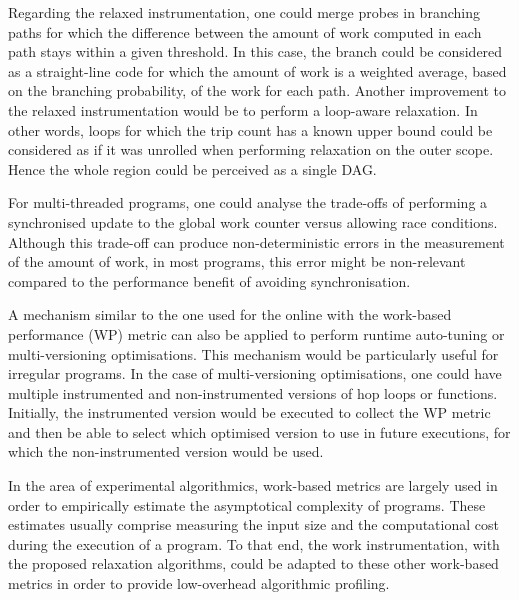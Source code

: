 Regarding the relaxed instrumentation,
one could merge probes in branching paths for which the difference between the amount of work computed in each path stays within a given threshold.
In this case, the branch could be considered as a straight-line code for which the amount of work is a weighted average, based on the branching probability, of the work for each path.
Another improvement to the relaxed instrumentation would be to perform a loop-aware relaxation.
In other words, loops for which the trip count has a known upper bound could be considered as if it was unrolled when performing relaxation on the outer scope.
Hence the whole region could be perceived as a single DAG.

For multi-threaded programs, one could analyse the trade-offs of performing a synchronised update to the global work counter versus allowing race conditions.
Although this trade-off can produce non-deterministic errors in the measurement of the amount of work, in most programs, this error might be non-relevant compared to the performance benefit of avoiding synchronisation.

A mechanism similar to the one used for the online {\itercomp} with the work-based performance (WP) metric can also be applied to perform
runtime auto-tuning or multi-versioning optimisations.
This mechanism would be particularly useful for irregular programs.
In the case of multi-versioning optimisations, one could have multiple instrumented and non-instrumented versions of hop loops or functions.
Initially, the instrumented version would be executed to collect the WP metric and then be able to select which optimised version to use in future executions, 
for which the non-instrumented version would be used.

In the area of experimental algorithmics, work-based metrics are largely used in order to empirically estimate the asymptotical complexity of programs.
These estimates usually comprise measuring the input size and the computational cost during the execution of a program.
To that end, the work instrumentation, with the proposed relaxation algorithms, could be adapted to these other work-based metrics in order to provide low-overhead algorithmic profiling.
